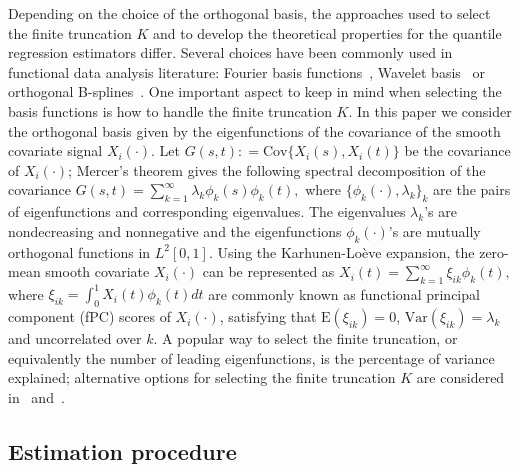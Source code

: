 \documentclass[times,sort&compress,3p]{elsarticle}
\theoremstyle{plain}%
\theoremstyle{definition}
\begin{document}
Depending on the choice of the orthogonal basis, the approaches used to select the finite truncation $K$ and to develop the theoretical properties for the quantile regression estimators differ. Several choices have been commonly used in functional data analysis literature: Fourier basis functions~\citep{Staicu+:15}, Wavelet basis~\citep{Morris+Carroll:06} or orthogonal B-splines~\citep{Zhou+:08,Redd:12}. %
One important aspect to keep in mind when selecting the basis functions is how to handle the finite truncation $K$. In this paper we consider the orthogonal basis given by the eigenfunctions of the covariance of the smooth covariate signal $X_i(\cdot)$. Let $G(s,t): =\mathrm{Cov}\{X_i(s),X_i(t)\}$ be the covariance of $X_i(\cdot)$; Mercer's theorem gives the following spectral decomposition of the covariance $G(s,t)=\sum_{k=1}^{\infty}\lambda_{k}\phi_{k}(s)\phi_{k}(t),$ where $\{\phi_k(\cdot), \lambda_k\}_k$ are the pairs of eigenfunctions and corresponding eigenvalues. The eigenvalues $\lambda_k$'s are nondecreasing and nonnegative and the eigenfunctions $\phi_k(\cdot)$'s are mutually orthogonal functions in $L^2[0,1]$. Using the
Karhunen-Lo\`{e}ve expansion, the zero-mean smooth covariate $X_i(\cdot)$ can be represented as
$X_i(t)=\sum_{k=1}^{\infty}\xi_{ik}\phi_{k}(t),$
where $\xi_{ik}=\int_0^1 X_i(t)\phi_{k}(t)dt$ are commonly known as functional principal component (fPC) { scores} of $X_i(\cdot)$, satisfying that $\text{E}(\xi_{ik})
=0$, $\text{Var}(\xi_{ik}) = \lambda_k$ and uncorrelated over $k$. A popular way to select the finite truncation, or equivalently the number of leading eigenfunctions, is the percentage of variance explained; 
alternative options for selecting the finite truncation $K$ are considered in~\cite{Li+Wang+Carroll:13} and~\cite{lee2014model}. 

 
\subsection{Estimation procedure} \label{subsection:estimation}
\end{document}
